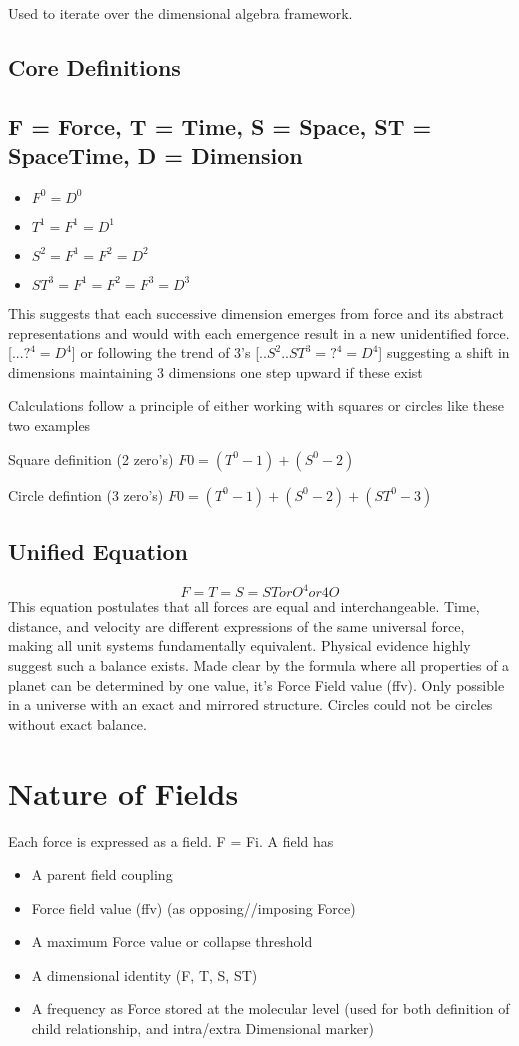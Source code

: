 \documentclass[12pt]{thesis}
\begin{document}
Used to iterate over the dimensional algebra framework.

\subsection{Core Definitions}
\subsection{F = Force, T = Time, S = Space, ST = SpaceTime, D = Dimension}
\begin{itemize}
    \item $F^0 = D^0$
    \item $T^1 = F^1 = D^1$
    \item $S^2 = F^1 = F^2 = D^2$
    \item $ST^3 = F^1 = F^2 = F^3 = D^3$
\end{itemize}

\noindent This suggests that each successive dimension emerges from force and its abstract representations and would with each emergence result in a new unidentified force. [$...?^4 = D^4$] or following the trend of 3's [$..S^2..ST^3 = ?^4 = D^4$] suggesting a shift in dimensions maintaining 3 dimensions one step upward if these exist

Calculations follow a principle of either working with squares or circles like these two examples

Square definition (2 zero's)
$F0 = (T^0-1)+(S^0-2)$

Circle defintion (3 zero's)
$F0 = (T^0-1)+(S^0-2)+(ST^0-3)$

\subsection{Unified Equation}
\[
F = T = S = ST or O^4 or 4O
\]
This equation postulates that all forces are equal and interchangeable. Time, distance, and velocity are different expressions of the same universal force, making all unit systems fundamentally equivalent. Physical evidence highly suggest such a balance exists. Made clear by the formula where all properties of a planet can be determined by one value, it's Force Field value (ffv).
Only possible in a universe with an exact and mirrored structure. Circles could not be circles without exact balance.

\section{Nature of Fields}
Each force is expressed as a field. F = Fi. A field has
\begin{itemize}
    \item A parent field coupling
    \item Force field value (ffv) (as opposing//imposing Force)
    \item A maximum Force value or collapse threshold
    \item A dimensional identity (F, T, S, ST)
    \item A frequency as Force stored at the molecular level (used for both definition of child relationship, and intra/extra Dimensional marker)
\end{itemize}
\end{document}
